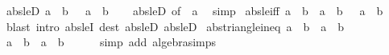 \begin{isabellebody}
\isanewline
%
\endisadelimproof
\isanewline
{}\isamarkupfalse%
\ abs{\isacharunderscore}{\kern0pt}le{\isacharunderscore}{\kern0pt}D{}{\isacharcolon}{\kern0pt}\ {\isachardoublequoteopen}{\isasymbar}a{\isasymbar}\ {\isasymle}\ b\ {\isasymLongrightarrow}\ {\isacharminus}{\kern0pt}\ a\ {\isasymle}\ b{\isachardoublequoteclose}\isanewline
%
\isadelimproof
\ \ %
\endisadelimproof
%
\isatagproof
{}\isamarkupfalse%
\ abs{\isacharunderscore}{\kern0pt}le{\isacharunderscore}{\kern0pt}D{}\ {\isacharbrackleft}{\kern0pt}of\ {\isachardoublequoteopen}{\isacharminus}{\kern0pt}\ a{\isachardoublequoteclose}{\isacharbrackright}{\kern0pt}\ \isamarkupfalse%
\ simp%
\endisatagproof
{\isafoldproof}%
%
\isadelimproof
\isanewline
%
\endisadelimproof
\isanewline
{}\isamarkupfalse%
\ abs{\isacharunderscore}{\kern0pt}le{\isacharunderscore}{\kern0pt}iff{\isacharcolon}{\kern0pt}\ {\isachardoublequoteopen}{\isasymbar}a{\isasymbar}\ {\isasymle}\ b\ {\isasymlongleftrightarrow}\ a\ {\isasymle}\ b\ {\isasymand}\ {\isacharminus}{\kern0pt}\ a\ {\isasymle}\ b{\isachardoublequoteclose}\isanewline
%
\isadelimproof
\ \ %
\endisadelimproof
%
\isatagproof
{}\isamarkupfalse%
\ {\isacharparenleft}{\kern0pt}blast\ intro{\isacharcolon}{\kern0pt}\ abs{\isacharunderscore}{\kern0pt}leI\ dest{\isacharcolon}{\kern0pt}\ abs{\isacharunderscore}{\kern0pt}le{\isacharunderscore}{\kern0pt}D{}\ abs{\isacharunderscore}{\kern0pt}le{\isacharunderscore}{\kern0pt}D{}{\isacharparenright}{\kern0pt}%
\endisatagproof
{\isafoldproof}%
%
\isadelimproof
\isanewline
%
\endisadelimproof
\isanewline
{}\isamarkupfalse%
\ abs{\isacharunderscore}{\kern0pt}triangle{\isacharunderscore}{\kern0pt}ineq{}{\isacharcolon}{\kern0pt}\ {\isachardoublequoteopen}{\isasymbar}a{\isasymbar}\ {\isacharminus}{\kern0pt}\ {\isasymbar}b{\isasymbar}\ {\isasymle}\ {\isasymbar}a\ {\isacharminus}{\kern0pt}\ b{\isasymbar}{\isachardoublequoteclose}\isanewline
%
\isadelimproof
%
\endisadelimproof
%
\isatagproof
{}\isamarkupfalse%
\ {\isacharminus}{\kern0pt}\isanewline
\ \ \isamarkupfalse%
\ {\isachardoublequoteopen}{\isasymbar}a{\isasymbar}\ {\isacharequal}{\kern0pt}\ {\isasymbar}b\ {\isacharplus}{\kern0pt}\ {\isacharparenleft}{\kern0pt}a\ {\isacharminus}{\kern0pt}\ b{\isacharparenright}{\kern0pt}{\isasymbar}{\isachardoublequoteclose}\isanewline
\ \ \ \ \isamarkupfalse%
\ {\isacharparenleft}{\kern0pt}simp\ add{\isacharcolon}{\kern0pt}\ algebra{\isacharunderscore}{\kern0pt}simps{\isacharparenright}{\kern0pt}\isanewline

\end{isabellebody}
